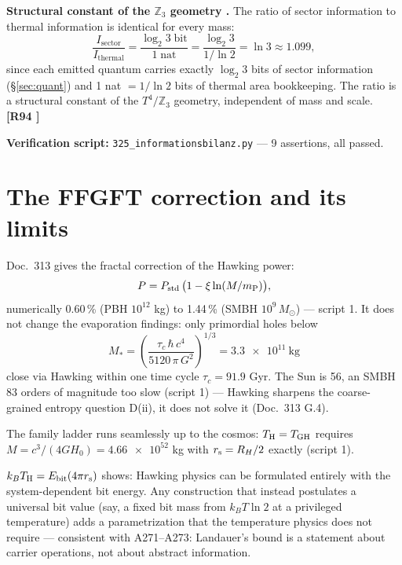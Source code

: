 \textbf{Structural constant of the $\mathbb{Z}_3$ geometry \B.}
The ratio of sector information to thermal information is identical
for every mass:
\begin{equation}
  \frac{I_{\mathrm{sector}}}{I_{\mathrm{thermal}}}
  = \frac{\log_2 3\;\text{bit}}{1\;\text{nat}}
  = \frac{\log_2 3}{1/\ln 2} = \ln 3 \approx 1.099,
\end{equation}
since each emitted quantum carries exactly $\log_2 3$ bits of sector
information (§\ref{sec:quant}) and 1 nat $= 1/\ln 2$ bits of thermal area bookkeeping.
The ratio is a structural constant of the $T^4/\mathbb{Z}_3$ geometry,
independent of mass and scale. \textbf{[R94 \B]}

\textbf{Verification script:} \texttt{325\_informationsbilanz.py} —
9 assertions, all passed.

\section{The FFGFT correction and its limits}

Doc.\ 313 gives the fractal correction of the Hawking power:
\begin{equation}
  P = P_{\mathrm{std}}\,\bigl(1 - \xi\ln(M/m_{\mathrm{P}})\bigr),
\end{equation}
numerically 0.60\,\% (PBH $10^{12}$ kg) to 1.44\,\% (SMBH $10^9\,M_\odot$)
— script 1. It does not change the evaporation findings:
only primordial holes below
\begin{equation}
  M_* = \left(\frac{\tau_c\,\hbar\,c^4}{5120\,\pi\,G^2}\right)^{1/3}
      = \num{3.3e11}\ \mathrm{kg}
\end{equation}
close via Hawking within one time cycle $\tau_c = 91.9$ Gyr.
The Sun is 56, an SMBH 83 orders of magnitude too slow
(script 1) — Hawking sharpens the coarse-grained entropy question
D(ii), it does not solve it (Doc.\ 313 G.4). \K

The family ladder runs seamlessly up to the cosmos:
$T_{\mathrm{H}} = T_{\mathrm{GH}}$ requires $M = c^3/(4GH_0) = \num{4.66e52}$ kg
with $r_{\mathrm{s}} = R_H/2$ exactly (script 1). \K

\begin{tcolorbox}[warnbox, title={Placement of the bit result}]
  $k_BT_{\mathrm{H}} = E_{\mathrm{bit}}(4\pi r_{\mathrm{s}})$ shows: Hawking physics can be formulated
  entirely with the system-dependent bit energy. Any construction that
  instead postulates a universal bit value (say, a fixed bit mass from
  $k_B T\ln 2$ at a privileged temperature) adds a parametrization
  that the temperature physics does not require — consistent with
  A271--A273: Landauer's bound is a statement about carrier
  operations, not about abstract information.
\end{tcolorbox}

